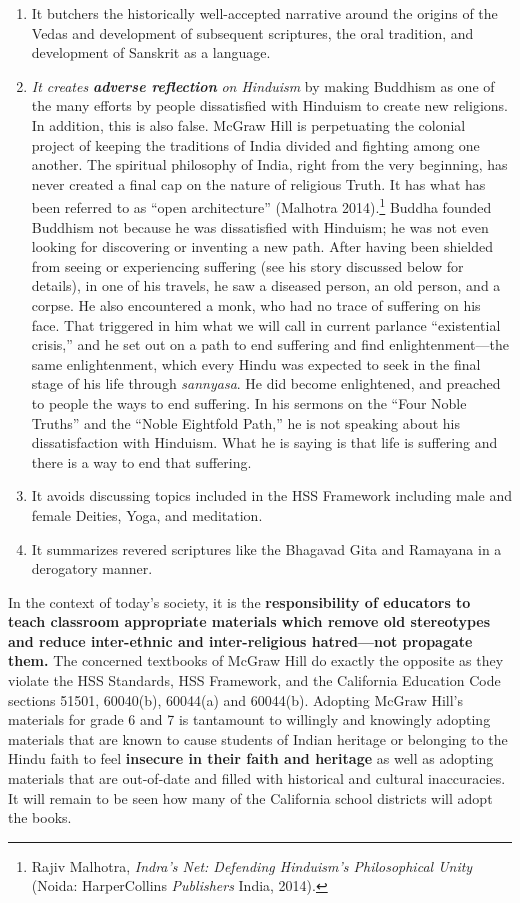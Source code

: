 \begin{enumerate}
\item It butchers the historically well-accepted narrative around the origins of the Vedas and development of subsequent scriptures, the oral tradition, and development of Sanskrit as a language. 

\item \textit{It creates} \textit{\textbf{adverse reflection}} \textit{ on Hinduism} by making Buddhism as one of the many efforts by people dissatisfied with Hinduism to create new religions. In addition, this is also false. McGraw Hill is perpetuating the colonial project of keeping the traditions of India divided and fighting among one another. The spiritual philosophy of India, right from the very beginning, has never created a final cap on the nature of religious Truth. It has what has been referred to as “open architecture” (Malhotra 2014).\footnote{Rajiv Malhotra, \textit{Indra’s Net: Defending Hinduism’s Philosophical Unity} (Noida: HarperCollins \textit{Publishers} India, 2014).} Buddha founded Buddhism not because he was dissatisfied with Hinduism; he was not even looking for discovering or inventing a new path. After having been shielded from seeing or experiencing suffering (see his story discussed below for details), in one of his travels, he saw a diseased person, an old person, and a corpse. He also encountered a monk, who had no trace of suffering on his face. That triggered in him what we will call in current parlance “existential crisis,” and he set out on a path to end suffering and find enlightenment—the same enlightenment, which every Hindu was expected to seek in the final stage of his life through \textit{sannyasa}. He did become enlightened, and preached to people the ways to end suffering. In his sermons on the “Four Noble Truths” and the “Noble Eightfold Path,” he is not speaking about his dissatisfaction with Hinduism. What he is saying is that life is suffering and there is a way to end that suffering. 

\item It avoids discussing topics included in the HSS Framework including male and female Deities, Yoga, and meditation.
\item It summarizes revered scriptures like the Bhagavad Gita and Ramayana in a derogatory manner.
\end{enumerate}
In the context of today’s society, it is the \textbf{responsibility of educators to teach classroom appropriate materials which remove old stereotypes and reduce inter-ethnic and inter-religious hatred—not propagate them.} The concerned textbooks of McGraw Hill do exactly the opposite as they violate the HSS Standards, HSS Framework, and the California Education Code sections 51501, 60040(b), 60044(a) and 60044(b). Adopting McGraw Hill’s materials for grade 6 and 7 is tantamount to willingly and knowingly adopting materials that are known to cause students of Indian heritage or belonging to the Hindu faith to feel \textbf{insecure in their faith and heritage} as well as adopting materials that are out-of-date and filled with historical and cultural inaccuracies. It will remain to be seen how many of the California school districts will adopt the books. 

